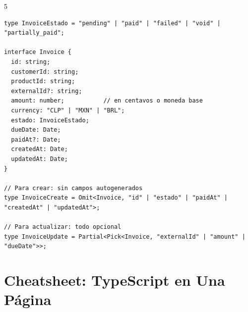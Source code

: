 \documentclass[11pt,a4paper]{article}
\begin{document}
\begin{solucionbox}{5}
\begin{lstlisting}[style=typescript]
type InvoiceEstado = "pending" | "paid" | "failed" | "void" | "partially_paid";

interface Invoice {
  id: string;
  customerId: string;
  productId: string;
  externalId?: string;
  amount: number;           // en centavos o moneda base
  currency: "CLP" | "MXN" | "BRL";
  estado: InvoiceEstado;
  dueDate: Date;
  paidAt?: Date;
  createdAt: Date;
  updatedAt: Date;
}

// Para crear: sin campos autogenerados
type InvoiceCreate = Omit<Invoice, "id" | "estado" | "paidAt" | "createdAt" | "updatedAt">;

// Para actualizar: todo opcional
type InvoiceUpdate = Partial<Pick<Invoice, "externalId" | "amount" | "dueDate">>;
\end{lstlisting}
\end{solucionbox}

\newpage
\section{Cheatsheet: TypeScript en Una Página}
\end{document}
